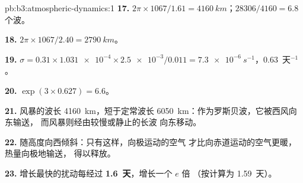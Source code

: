 \begin{solution}{pb:b3:atmospheric-dynamics:1}
\textbf{17.} $2\pi\times1067/1.61 = \qty{4160}{km}$；$28306/4160 = 6.8$
个波。

\textbf{18.} $2\pi\times1067/2.40 = \qty{2790}{km}$。

\textbf{19.} $\sigma = 0.31\times\num{1.031e-4}\times\num{2.5e-3}/0.011 =
\qty{7.3e-6}{s^{-1}}$，\num{0.63}~天$^{-1}$。

\textbf{20.} $\exp(3\times0.627) = 6.6$。

\textbf{21.} 风暴的波长 \qty{4160}{km}，短于定常波长
\qty{6050}{km}：作为罗斯贝波，它被西风向东输送，
而风暴则经由较慢或静止的长波
向东移动。

\textbf{22.} 随高度向西倾斜：只有这样，向极运动的空气
才比向赤道运动的空气更暖，热量向极地输送，
得以释放。

\textbf{23.} 增长最快的扰动每经过
\textbf{\num[text-series-to-math=true]{1.6}~天}，增长一个 $e$ 倍
（按计算为 \num{1.59}~天）。
\end{solution}
